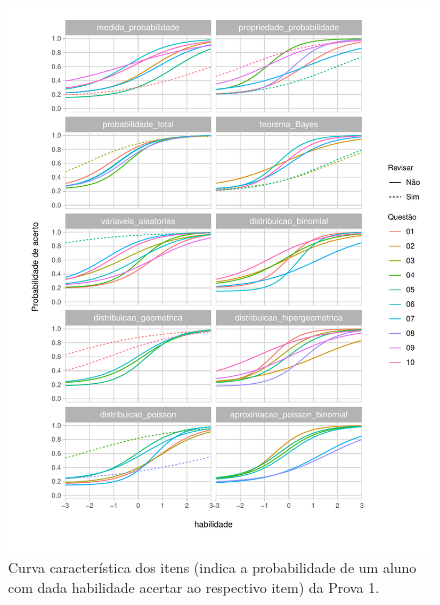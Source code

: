 \documentclass[a4paper]{report}
\begin{document}
\begin{figure}
\centering
\includegraphics{Relatorio_files/figure-latex/unnamed-chunk-6-1.pdf}
\caption{Curva característica dos itens (indica a probabilidade de um
aluno com dada habilidade acertar ao respectivo item) da Prova 1.}
\end{figure}
\end{document}
